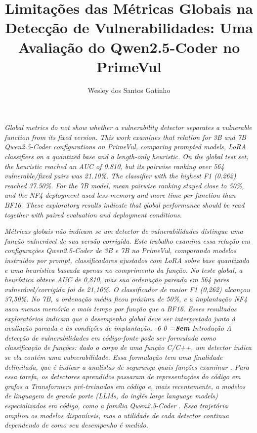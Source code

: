 \documentclass[12pt,a4paper]{article}
\title{Limitações das Métricas Globais na Detecção de Vulnerabilidades: Uma Avaliação do Qwen2.5-Coder no PrimeVul}
\author{Wesley dos Santos Gatinho}
\makeatletter
\newcommand{\XIIIPT}{\@setfontsize\xiiipt{13}{17}}
\renewcommand\section{\@startsection{section}{1}{\z@}%
                       {-6\p@ \@plus -4\p@ \@minus -4\p@}%
                       {0\p@ \@plus 4\p@ \@minus 4\p@}%
                       {\normalfont\XIIIPT\bfseries\boldmath
                        \rightskip=\z@ \@plus 8em\pretolerance=10000 }}
\let\maketitleOLD\maketitle
\renewcommand{\maketitle}{\maketitleOLD\thispagestyle{empty}}
\renewenvironment{abstract}{%
      \list{}{\advance\topsep by6pt\relax%
      \leftmargin=0.8cm
      \labelwidth=\z@
      \listparindent=\z@
      \itemindent\listparindent
      \rightmargin\leftmargin}\item[\hskip\labelsep
                                    \bfseries\itshape Abstract.]\itshape}%
      {\endlist}
\newenvironment{resumo}{%
      \list{}{\advance\topsep by6pt\relax%
      \leftmargin=0.8cm
      \labelwidth=\z@
      \listparindent=\z@
      \itemindent\listparindent
      \rightmargin\leftmargin}\item[\hskip\labelsep
                                    \bfseries\itshape Resumo.]\itshape}%
      {\endlist}
\makeatother
\begin{document}
\maketitle
\begin{abstract}
Global metrics do not show whether a vulnerability detector separates a vulnerable function from its fixed version. This work examines that relation for 3B and 7B Qwen2.5-Coder configurations on PrimeVul, comparing prompted models, LoRA classifiers on a quantized base and a length-only heuristic. On the global test set, the heuristic reached an AUC of 0.810, but its pairwise ranking over 564 vulnerable/fixed pairs was 21.10\%. The classifier with the highest F1 (0.262) reached 37.50\%. For the 7B model, mean pairwise ranking stayed close to 50\%, and the NF4 deployment used less memory and more time per function than BF16. These exploratory results indicate that global performance should be read together with paired evaluation and deployment conditions.
\end{abstract}
\begin{resumo}
Métricas globais não indicam se um detector de vulnerabilidades distingue uma função vulnerável de sua versão corrigida. Este trabalho examina essa relação em configurações Qwen2.5-Coder de 3B e 7B no PrimeVul, comparando modelos instruídos por \textit{prompt}, classificadores ajustados com LoRA sobre base quantizada e uma heurística baseada apenas no comprimento da função. No teste global, a heurística obteve AUC de 0,810, mas sua ordenação pareada em 564 pares vulnerável/corrigida foi de 21,10\%. O classificador de maior F1 (0,262) alcançou 37,50\%. No 7B, a ordenação média ficou próxima de 50\%, e a implantação NF4 usou menos memória e mais tempo por função que a BF16. Esses resultados exploratórios indicam que o desempenho global deve ser interpretado junto à avaliação pareada e às condições de implantação.
\end{resumo}
\section{Introdução}\label{sec:1}
A detecção de vulnerabilidades em código-fonte pode ser formulada como classificação de funções: dado o corpo de uma função C/C++, um detector indica se ela contém uma vulnerabilidade. Essa formulação tem uma finalidade delimitada, que é indicar a analistas de segurança quais funções examinar \citep{fu2022linevul}. Para essa tarefa, os detectores aprendidos passaram de representações do código em grafos \citep{zhou2019devign} a Transformers pré-treinados em código \citep{fu2022linevul} e, mais recentemente, a modelos de linguagem de grande porte (LLMs, do inglês \textit{large language models}) especializados em código, como a família Qwen2.5-Coder \citep{hui2024qwen}. Essa trajetória ampliou os modelos disponíveis, mas a utilidade de cada detector continua dependendo de como seu desempenho é medido.
\end{document}
